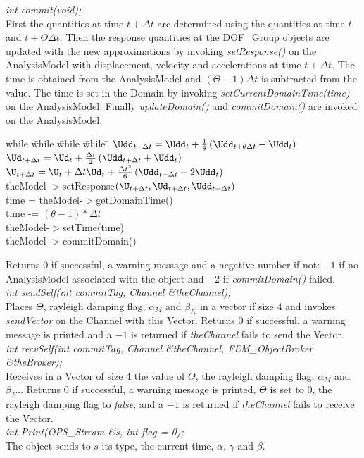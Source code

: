 {\em int commit(void);}\\
First the quantities at time $t + \Delta t$ are determined using the
quantities at time $t$ and $t + \Theta \Delta t$.
Then the response quantities at the DOF\_Group objects are updated
with the new approximations by invoking {\em setResponse()} on the
AnalysisModel with displacement, velocity and accelerations at time $t +
\Delta t$. The time is obtained from the AnalysisModel and $(\Theta
-1) \Delta t$ is subtracted from the value. The time is set in the
Domain by invoking {\em setCurrentDomainTime(time)} on the
AnalysisModel. Finally {\em updateDomain()} and {\em commitDomain()}
are invoked on the AnalysisModel. 
\begin{tabbing}
while \= while \= while \= while \= \kill
\>\> $\Udd_{t + \Delta t} = \Udd_t + \frac{1}{\theta} \left( \Udd_{t +
\theta \Delta t} - \Udd_t \right)$ \\
\>\> $ \Ud_{t + \Delta t} = \Ud_t + \frac{\Delta t}{2}\left( \Udd_{t +
\Delta t} + \Udd_t \right) $ \\
\>\> $ \U_{t + \Delta t} = \U_t + \Delta t\Ud_t + \frac{\Delta t^2}{6}\left(
\Udd_{t + \Delta t} + 2 \Udd_t \right) $ \\
\>\> theModel-$>$setResponse$(\U_{t + \Delta t}, \Ud_{t+
\Delta t}, \Udd_{t+\Delta t})$ \\
\>\> time = theModel-$>$getDomainTime() \\
\>\> time -= $(\theta -1) * \Delta t$ \\
\>\> theModel-$>$setTime(time) \\
\>\> theModel-$>$commitDomain()
\end{tabbing}
Returns $0$ if successful, a warning
message and a negative number if not: $-1$ if no AnalysisModel
associated with the object and $-2$ if {\em commitDomain()} failed. \\


{\em int sendSelf(int commitTag, Channel \&theChannel); } \\ 
Places $\Theta$, rayleigh damping flag, $\alpha_M$ and $\beta_K$ in a
vector if size 4 and invokes {\em sendVector} on the Channel with this
Vector. Returns $0$ if successful, a warning message is printed and a
$-1$ is returned if {\em theChannel} fails to send the Vector. \\ 

{\em int recvSelf(int commitTag, Channel \&theChannel, 
FEM\_ObjectBroker \&theBroker); } \\ 
Receives in a Vector of size 4 the value of $\Theta$, the rayleigh
damping flag, $\alpha_M$ and $\beta_K$.. Returns $0$ if
successful, a warning message is printed,  $\Theta$ is set to $0$, the
rayleigh damping flag to {\em false}, and a $-1$ is returned if {\em
theChannel} fails to receive the Vector.\\ 

{\em int Print(OPS_Stream \&s, int flag = 0);}\\
The object sends to $s$ its type, the current time, $\alpha$, $\gamma$ and
$\beta$. 

